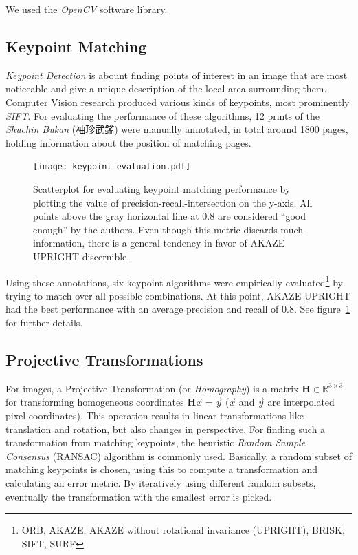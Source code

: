 \documentclass{ltjarticle}
\begin{document}
We used the \emph{OpenCV} software library.\cite{opencv_library}

\subsection{Keypoint Matching}

\emph{Keypoint Detection}\cite[Ch.4]{szeliski2010computer} is abount finding points of interest in an image that are most noticeable and give a unique description of the local area surrounding them. Computer Vision research produced various kinds of keypoints, most prominently \emph{SIFT}.\cite{lowe2004sift} For evaluating the performance of these algorithms, 12 prints of the \emph{Shūchin Bukan} (袖珍武鑑) were manually annotated, in total around 1800 pages, holding information about the position of matching pages.

\begin{figure}[p]
    \centering
    \texttt{[image: keypoint-evaluation.pdf]}
    \caption[Scatterplot of keypoint matching performance]{Scatterplot for evaluating keypoint matching performance by plotting the value of precision-recall-intersection on the y-axis. All points above the gray horizontal line at $0.8$ are considered “good enough” by the authors. Even though this metric discards much information, there is a general tendency in favor of AKAZE UPRIGHT discernible.}
    \label{fig:keypoint-evaluation}
\end{figure}

Using these annotations, six keypoint algorithms were empirically evaluated\footnote{ORB\cite{rublee2011orb}, AKAZE\cite{alcantarilla2011fast}, AKAZE without rotational invariance (UPRIGHT), BRISK\cite{leutenegger2011brisk}, SIFT, SURF\cite{bay2006surf}} by trying to match over all possible combinations. At this point, AKAZE UPRIGHT had the best performance with an average precision and recall of $0.8$. See figure~\ref{fig:keypoint-evaluation} for further details.

\subsection{Projective Transformations}

For images, a Projective Transformation (or \emph{Homography}) is a matrix $\mathbf{H} \in \mathbb{R}^{3 \times 3}$ for transforming homogeneous coordinates $\mathbf{H}\vec{x} = \vec{y}$ ($\vec{x}$ and $\vec{y}$ are interpolated pixel coordinates). This operation results in linear transformations like translation and rotation, but also changes in perspective. For finding such a transformation from matching keypoints, the heuristic \emph{Random Sample Consensus} (RANSAC) algorithm is commonly used.\cite{fischler1981random} Basically, a random subset of matching keypoints is chosen, using this to compute a transformation and calculating an error metric. By iteratively using different random subsets, eventually the transformation with the smallest error is picked.
\end{document}
